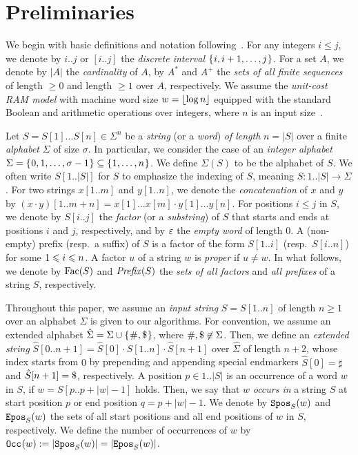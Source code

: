 \section{Preliminaries}
\label{sec:prelim}

We begin with basic definitions and notation following~\cite{charalampopoulos2018extended,barton2014linear,ilie2011minimum,belazzougui2015space:unusual}.
For any integers $i\le j$, we denote by $i..j$ or $[i..j]$ the \textit{discrete interval} $\set{i, i+1, \dots, j}$. For a set $A$, we denote by $|A|$ the \textit{cardinality} of $A$, by $A^*$ and $A^+$ the \textit{sets of all finite sequences} of length $\ge 0$ and length $\ge 1$ over $A$, respectively.
We assume the \textit{unit-cost RAM model} with machine word size $w = \floor{\log n}$ equipped with the standard Boolean and arithmetic operations over integers, where $n$ is an input size~\cite{cormen2009introduction}.

Let $S = S[1]\dots S[n] \in \Sigma^n$ be a \textit{string} (or a \textit{word}) \textit{of length} $n = |S|$ over a finite \textit{alphabet} $\Sigma$ of size $\sigma$. In particular, we consider the case of an \textit{integer alphabet} $\Sigma = \set{0,1,\dots, \sigma - 1} \subseteq \set{1, \dots, n}$. We define $\Sigma(S)$ to be the alphabet of $S$. 
We often write $S[1..|S|]$ for $S$ to emphasize the indexing of $S$, meaning $S: 1..|S| \to \Sigma$. 
For two strings $x[1..m]$ and $y[1..n]$, we denote the \textit{concatenation} of $x$ and $y$ by $(x\cdot y)[1..m+n] = x[1]\dots x[m]\cdot y[1]\dots y[n]$.
For positions $i\le j$ in $S$, we denote by $S[i..j]$ the \textit{factor} (or a \textit{substring}) of $S$ that starts and ends at positions $i$ and $j$, respectively, and by $\eps$ the \textit{empty word} of length $0$. A (non-empty) prefix (resp.~a suffix) of $S$ is a factor of the form $S[1..i]$ (resp.~$S[i..n]$) for some $\btw i1n$. A factor $u$ of a string $w$ is \textit{proper} if $u\not= w$. In what follows, we denote by $\Fac(S)$ and $\Pref(S)$ the \textit{sets of all factors} and \textit{all prefixes} of a string $S$, respectively. 

Throughout this paper, we assume an \textit{input string} $S = S[1..n]$ of length $n\ge 1$ over an alphabet $\Sigma$ is given to our algorithms. For convention, we assume an extended alphabet $\hat\Sigma = \Sigma\cup\set{\sharp, \daller}$, where $\#, \daller \not \in \Sigma$. Then, we define an \textit{extended string} $\hat S[0..n+1] = \hat S[0]\cdot S[1..n]\cdot \hat S[n+1]$  over $\hat \Sigma$ of length $n+2$, whose index starts from $0$ by prepending and appending special endmarkers $\hat S[0] = \sharp$ and $\hat S[n+1] = \daller$, respectively. 
A position $p \in 1..|S|$ is an occurrence of a word $w$ in $S$, if $w = S[p..p+|w|-1]$ holds. Then, we say that $w$ \textit{occurs in} a string $S$ at start position $p$ or end position $q = p + |w| - 1$. 
We denote by $\spos(w)$ and $\epos(w)$ the sets of all start positions and all end positions of $w$ in $S$, respectively. 
We define the number of occurrences of $w$ by $\occ(w) := |\spos(w)| = |\epos(w)|$. 


